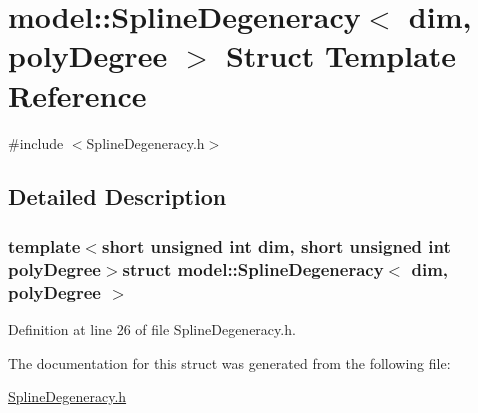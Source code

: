 \hypertarget{structmodel_1_1_spline_degeneracy}{}\section{model\+:\+:Spline\+Degeneracy$<$ dim, poly\+Degree $>$ Struct Template Reference}
\label{structmodel_1_1_spline_degeneracy}


{\ttfamily \#include $<$Spline\+Degeneracy.\+h$>$}



\subsection{Detailed Description}
\subsubsection*{template$<$short unsigned int dim, short unsigned int poly\+Degree$>$struct model\+::\+Spline\+Degeneracy$<$ dim, poly\+Degree $>$}



Definition at line 26 of file Spline\+Degeneracy.\+h.



The documentation for this struct was generated from the following file\+:\begin{DoxyCompactItemize}
\item 
\hyperlink{_spline_degeneracy_8h}{Spline\+Degeneracy.\+h}\end{DoxyCompactItemize}
